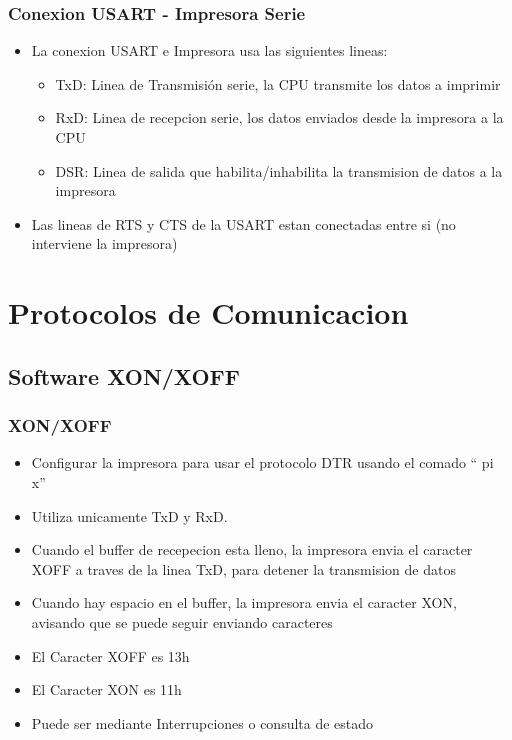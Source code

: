 \documentclass{beamer}
\begin{document}
\begin{frame}[fragile]
\frametitle{Conexion USART - Impresora Serie}
\begin{itemize}
 \item La conexion USART e Impresora usa las siguientes lineas:
 \begin{itemize}
  \item TxD: Linea de Transmisión serie, la CPU transmite los datos a imprimir
  \item RxD: Linea de recepcion serie, los datos enviados desde la impresora a la CPU
  \item DSR: Linea de salida que habilita/inhabilita la transmision de datos a la impresora
\end{itemize}
\item Las lineas de RTS y CTS de la USART estan conectadas entre si (no interviene la impresora)
\end{itemize}
\end{frame}

\section{Protocolos de Comunicacion}
\subsection{Software XON/XOFF}
\begin{frame}[fragile]
\frametitle{XON/XOFF}
\begin{itemize}
 \item Configurar la impresora para usar el protocolo DTR usando el comado `` pi x''
 \item Utiliza unicamente TxD y RxD.
 \item Cuando el buffer de recepecion esta lleno, la impresora envia el caracter XOFF a traves de la linea TxD, para detener la transmision de datos
 \item Cuando hay espacio en el buffer, la impresora envia el caracter XON, avisando que se puede seguir enviando caracteres
 \item El Caracter XOFF es 13h
 \item El Caracter XON es 11h
 \item Puede ser mediante Interrupciones o consulta de estado
\end{itemize}

\end{frame}
\end{document}
